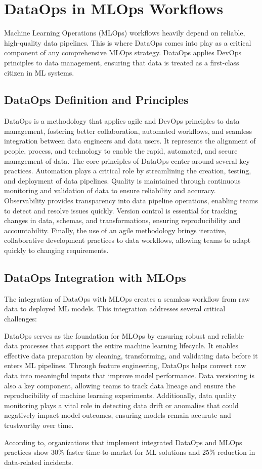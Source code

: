 \section{DataOps in MLOps Workflows}\label{sec:dataops}
Machine Learning Operations (MLOps) workflows heavily depend on reliable, high-quality data pipelines.
This is where DataOps comes into play as a critical component of any comprehensive MLOps strategy.
DataOps applies DevOps principles to data management, ensuring that data is treated as a first-class citizen in ML systems.

\subsection{DataOps Definition and Principles}\label{subsec:dataops-definition}

DataOps is a methodology that applies agile and DevOps principles to data management, fostering better collaboration,
automated workflows, and seamless integration between data engineers and data users\cite{ad-hoc-dataops}.
It represents the alignment of people, process, and technology to enable the rapid, automated, and secure management of data.
The core principles of DataOps center around several key practices.
Automation plays a critical role by streamlining the creation, testing, and deployment of data pipelines.
Quality is maintained through continuous monitoring and validation of data to ensure reliability and accuracy.
Observability provides transparency into data pipeline operations, enabling teams to detect and resolve issues quickly.
Version control is essential for tracking changes in data, schemas, and transformations, ensuring reproducibility and accountability.
Finally, the use of an agile methodology brings iterative, collaborative development practices to data workflows, allowing teams to adapt quickly to changing requirements.

\subsection{DataOps Integration with MLOps}\label{subsec:dataops-mlops-integration}

The integration of DataOps with MLOps creates a seamless workflow from raw data to deployed ML models.
This integration addresses several critical challenges:

DataOps serves as the foundation for MLOps by ensuring robust and reliable data processes that support the entire machine learning lifecycle.
It enables effective data preparation by cleaning, transforming, and validating data before it enters ML pipelines.
Through feature engineering, DataOps helps convert raw data into meaningful inputs that improve model performance.
Data versioning is also a key component, allowing teams to track data lineage and ensure the reproducibility of machine learning experiments.
Additionally, data quality monitoring plays a vital role in detecting data drift or anomalies that could negatively impact model outcomes, ensuring models remain accurate and trustworthy over time.

According to\cite{ad-hoc-dataops}, organizations that implement integrated DataOps and MLOps practices
show 30\% faster time-to-market for ML solutions and 25\% reduction in data-related incidents.